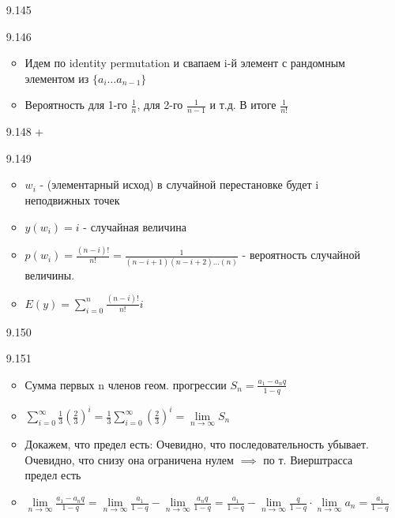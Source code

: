 \documentclass{article}
\begin{document}
\begin{enumerate}
    \item [9.145]
    \item [9.146]
    \begin{itemize}
        \item Идем по identity permutation и свапаем i-й элемент с рандомным элементом из $\{a_i \dots a_{n-1}\}$
        \item Вероятность для 1-го $\frac{1}{n}$, для 2-го $\frac{1}{n-1}$ и т.д. В итоге $\frac{1}{n!}$
    \end{itemize}
    \item [9.148] +
    \item [9.149]  
    \begin{itemize}
        \item $w_i$ - (элементарный исход) в случайной перестановке будет i неподвижных точек
        \item $y(w_i) = i$ - случайная величина
        \item $p(w_i) = \frac{(n - i)!}{n!} = \frac{1}{(n-i+1)(n-i+2)\dots(n)}$ - вероятность случайной величины.
        \item $E(y) = \sum\limits_{i = 0}^{n}{\frac{(n-i)!}{n!}i}$
    \end{itemize}
    \item [9.150]
    \item [9.151]
    \begin{itemize}
        \item Сумма первых n членов геом. прогрессии $S_n = \frac{a_1 - a_n q}{1 - q}$
        \item $\sum\limits_{i = 0}^{\infty}\frac{1}{3}(\frac{2}{3})^i = 
        \frac{1}{3}\sum\limits_{i = 0}^{\infty}(\frac{2}{3})^i = 
        \lim\limits_{n \to \infty}{S_n}$
        \item Докажем, что предел есть: Очевидно, что последовательность убывает. Очевидно, что снизу она ограничена нулем $\implies$ по т. Виерштрасса предел есть \\
        \item $\lim\limits_{n \to \infty}{\frac{a_1 - a_n q}{1 - q}} = \lim\limits_{n \to \infty}{\frac{a_1}{1 - q}} - \lim\limits_{n \to \infty}{\frac{a_n q}{1 - q}} = 
        {\frac{a_1}{1 - q}} - \lim\limits_{n \to \infty}{\frac{q}{1 - q}}  \cdot \lim\limits_{n \to \infty}{a_n} = 
        {\frac{a_1}{1 - q}}$

    \end{itemize}
\end{enumerate}
\end{document}
